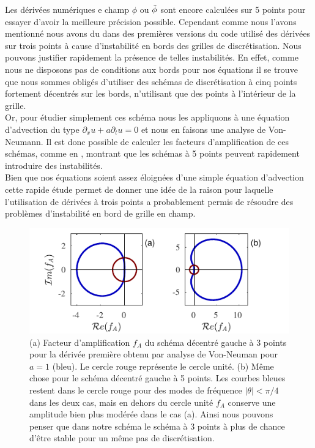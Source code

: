 \documentclass[10.5pt]{article}
\begin{document}
\begin{multicols}{2}
Les dérivées numériques e champ $\phi$ ou $\tilde{\phi}$ sont encore calculées sur 5 points pour essayer d'avoir la meilleure  précision possible. Cependant comme nous l'avons mentionné nous avons du dans des premières versions du code utilisé des dérivées sur trois points à cause d'instabilité en bords des grilles de discrétisation. Nous pouvons justifier rapidement la présence de telles instabilités. En effet, comme nous ne disposons pas de conditions aux bords pour nos équations il se trouve que nous sommes obligés d'utiliser des schémas de discrétisation à cinq points fortement décentrés sur les bords, n'utilisant que des points à l'intérieur de la grille.\\


Or, pour étudier simplement ces schéma nous les appliquons à une équation d'advection du type $\partial_x u + a \partial_t u = 0$ et nous en faisons une analyse de Von-Neumann. Il est donc possible de calculer les facteurs d'amplification de ces schémas, comme en , montrant que les schémas à 5 points peuvent rapidement introduire des instabilités.\\

Bien que nos équations soient assez éloignées d'une simple équation d'advection cette rapide étude permet de donner une idée de la raison pour laquelle l'utilisation de dérivées à trois points a probablement permis de résoudre des problèmes d'instabilité en bord de grille en champ.

\begin{figure}[H]
\begin{center}
	\includegraphics[width=0.95\columnwidth]{FacAmp.pdf}
\end{center}
\caption{(a) Facteur d'amplification $f_A$ du schéma décentré gauche à 3 points pour la dérivée première obtenu par analyse de Von-Neuman pour $a=1$ (bleu). Le cercle rouge représente le cercle unité. (b) Même chose pour le schéma décentré gauche à 5 points. Les courbes bleues restent dans le cercle rouge pour des modes de fréquence $|\theta| < \pi/4$ dans les deux cas, mais en dehors du cercle unité $f_A$ conserve une amplitude bien plus modérée dans le cas (a). Ainsi nous pouvons penser que dans notre schéma le schéma à 3 points à plus de chance d'être stable pour un même pas de discrétisation.}
\label{fig:FacAmp}
\end{figure}



\end{multicols}
\end{document}
